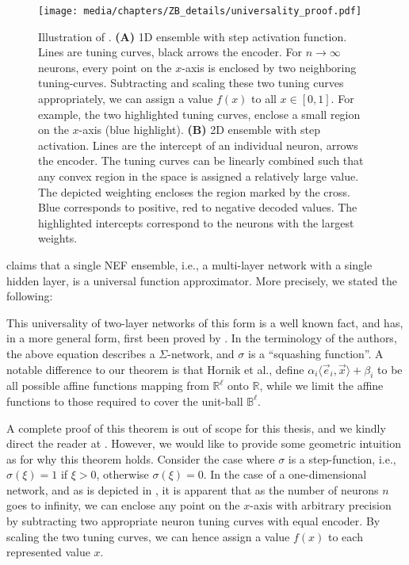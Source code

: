 \begin{figure}
	\centering
	\texttt{[image: media/chapters/ZB\_details/universality\_proof.pdf]}%
	{\label{fig:universality_proof_a}}%
	{\label{fig:universality_proof_b}}%
	\caption[Illustration of ]{Illustration of . \textbf{(A)} 1D ensemble with step activation function. Lines are tuning curves, black arrows the encoder. For $n \to \infty$ neurons, every point on the $x$-axis is enclosed by two neighboring tuning-curves. Subtracting and scaling these two tuning curves appropriately, we can assign a value $f(x)$ to all $x \in [0, 1]$.
	For example, the two highlighted tuning curves, enclose a small region on the $x$-axis (blue highlight).
	\textbf{(B)} 2D ensemble with step activation. Lines are the intercept of an individual neuron, arrows the encoder.
	The tuning curves can be linearly combined such that any convex region in the space is assigned a relatively large value.
	The depicted weighting encloses the region marked by the cross. Blue corresponds to positive, red to negative decoded values. The highlighted intercepts correspond to the neurons with the largest weights.}
\end{figure}

 claims that a single NEF ensemble, i.e., a multi-layer network with a single hidden layer, is a universal function approximator.
More precisely, we stated the following:

\ThmTwoLayerUniversal*

This universality of two-layer networks of this form is a well known fact, and has, in a more general form, first been proved by \citet{hornik1989multilayer}.
In the terminology of the authors, the above equation describes a $\Sigma$-network, and $\sigma$ is a \enquote{squashing function}.
A notable difference to our theorem is that Hornik et al., define $\alpha_i \langle \vec e_i, \vec x \rangle + \beta_i$ to be all possible affine functions mapping from $\mathbb{R}^\ell$ onto $\mathbb{R}$, while we limit the affine functions to those required to cover the unit-ball $\mathbb{B}^\ell$.

A complete proof of this theorem is out of scope for this thesis, and we kindly direct the reader at \citet{hornik1989multilayer}.
However, we would like to provide some geometric intuition as for why this theorem holds.
Consider the case where $\sigma$ is a step-function, i.e., $\sigma(\xi) = 1$ if $\xi > 0$, otherwise $\sigma(\xi) = 0$.
In the case of a one-dimensional network, and as is depicted in , it is apparent that as the number of neurons $n$ goes to infinity, we can enclose any point on the $x$-axis with arbitrary precision by subtracting two appropriate neuron tuning curves with equal encoder.
By scaling the two tuning curves, we can hence assign a value $f(x)$ to each represented value $x$.

